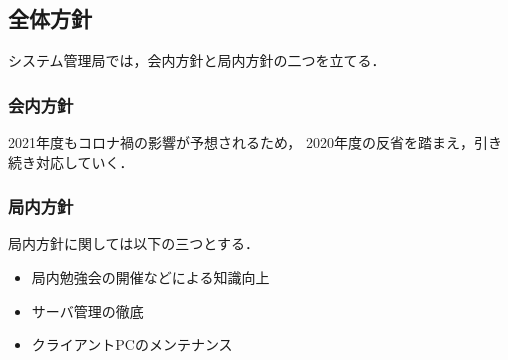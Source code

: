 \subsection*{全体方針}

システム管理局では，会内方針と局内方針の二つを立てる．

\subsubsection*{会内方針}
2021年度もコロナ禍の影響が予想されるため，
2020年度の反省を踏まえ，引き続き対応していく．

\subsubsection*{局内方針}
局内方針に関しては以下の三つとする．
\begin{itemize}
  \item 局内勉強会の開催などによる知識向上
  \item サーバ管理の徹底
  \item クライアントPCのメンテナンス
\end{itemize}
